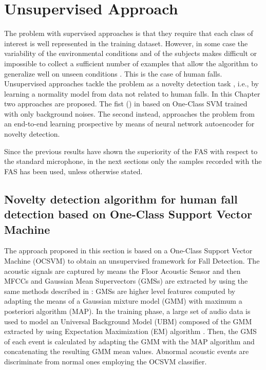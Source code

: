 \chapter{Unsupervised Approach}
\label{ch:unsupervised_approaches}

The problem with supervised approaches is that they require that each class of interest is well represented in the training dataset. However, in some case the variability of the environmental conditions and of the subjects makes difficult or impossible to collect a sufficient number of examples that allow the algorithm to generalize well on unseen conditions \cite{Noury2007}. This is the case of human falls. Unsupervised approaches tackle the problem as a novelty detection task \cite{markou2003novelty1,markou2003novelty2}, i.e., by learning a normality model from data not related to human falls. In this Chapter two approaches are proposed. The fist () in based on One-Class SVM  trained with only background noises. The second  instead, approaches the problem from an end-to-end learning prospective by means of neural network autoencoder  for novelty detection.

Since the previous results have shown the superiority of the FAS with respect to the standard microphone, in the next sections only the samples recorded with the FAS has been used, unless otherwise stated.

\section{Novelty detection algorithm for human fall detection based on One-Class Support Vector Machine}
\label{sec:ocsvm_approach}

The approach proposed in this section is based on a One-Class Support Vector Machine (OCSVM) \cite{scholkopf2000} to obtain an unsupervised framework for Fall Detection.
The acoustic signals are captured by means the Floor Acoustic Sensor and then MFCCs and Gaussian Mean Supervectors (GMSs) are extracted by using the same methods described in : GMSs are higher level features computed by adapting the means of a Gaussian mixture model (GMM) with maximum a posteriori algorithm (MAP).
In the training phase, a large set of audio data is used to model an Universal Background Model (UBM) composed of the GMM extracted by using Expectation Maximization (EM) algorithm \cite{bilmes1998gentle}.
Then, the GMS of each event is calculated by adapting the GMM with the MAP algorithm and concatenating the resulting GMM mean values.
Abnormal acoustic events are discriminate from normal ones employing the OCSVM classifier.



